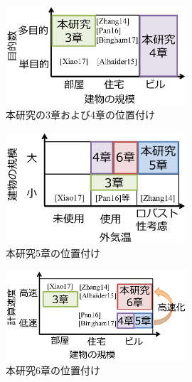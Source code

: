 \begin{figure}[ht]
    \begin{center}
        \includegraphics[width=0.6\textwidth,keepaspectratio=true]{fig/intro_position_objective.eps}
    \end{center}
    \caption{本研究の3章および4章の位置付け}
    \label{fig::intro_position_objective}
\end{figure}

\begin{figure}[ht]
    \begin{center}
        \includegraphics[width=0.6\textwidth,keepaspectratio=true]{fig/intro_position_robust.eps}
    \end{center}
    \caption{本研究5章の位置付け}
    \label{fig::intro_position_robust}
\end{figure}

\begin{figure}[ht]
    \begin{center}
        \includegraphics[width=0.6\textwidth,keepaspectratio=true]{fig/intro_position_speed.eps}
    \end{center}
    \caption{本研究6章の位置付け}
    \label{fig::intro_position_speed}
\end{figure}

